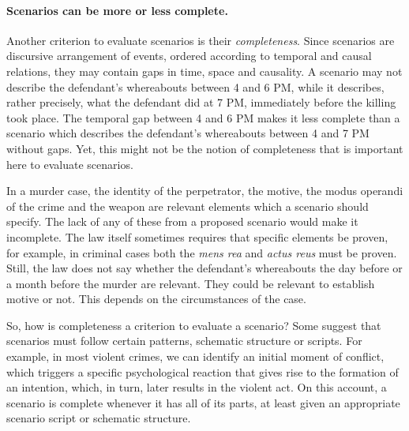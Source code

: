 \documentclass[10pt]{article}
\begin{document}
\paragraph{Scenarios can be more or less complete.}

Another criterion to evaluate scenarios is their \textit{completeness}. Since scenarios are discursive arrangement of events, ordered according to 
temporal and causal relations, they may contain gaps in time, space and causality. A scenario may not describe the defendant's whereabouts between 4 and 6 PM, 
while it describes, rather precisely, what the defendant did at 7 PM, immediately before the killing took place. The temporal gap between 4 and 6 PM 
makes it less complete than a scenario which describes the defendant's whereabouts between 4 and 7 PM without gaps. 
Yet, this might not be the notion of completeness that is important here to evaluate scenarios. 

In a murder case, the identity of the perpetrator, the motive, the 
modus operandi of the crime and the weapon are relevant elements which a scenario should specify. 
The lack of any of these from a proposed scenario would make it incomplete. 
The law itself sometimes requires that specific elements be proven, 
for example, in criminal cases both the \textit{mens rea} and \textit{actus reus} 
must be proven.   Still, the law does not say whether the defendant's whereabouts the day before or a month before 
the murder are relevant. They could be relevant to establish motive or not. 
This depends on the circumstances of the case.

So, how is completeness a criterion to evaluate a scenario? Some suggest that scenarios must follow certain patterns, 
schematic structure or scripts. For example, in most violent crimes, we can identify an initial 
moment of conflict, which triggers a specific psychological reaction that gives rise to the formation of an 
intention, which, in turn, later results in the violent act. On this account, a scenario is 
complete whenever it has all of its parts, at least given an appropriate scenario script or schematic structure. 

\end{document}
